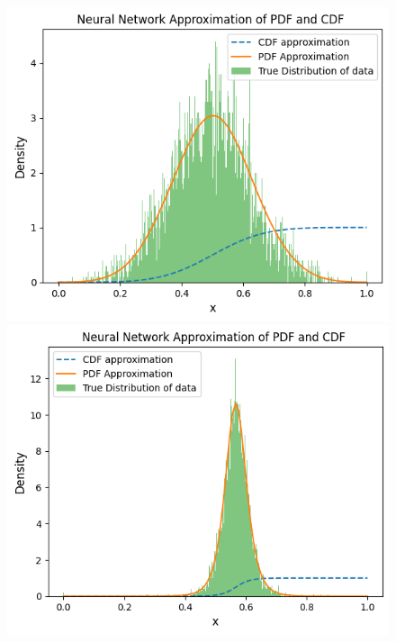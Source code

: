 \begin{figure}[h]
\centering

\begin{minipage}{0.49\textwidth}
\centering
\includegraphics[width=\textwidth]{5ResultsDiscussion/pictures/MarginalTest/Gaussian.png}
\end{minipage}
\hfill
\begin{minipage}{0.49\textwidth}
\centering
\includegraphics[width=\textwidth]{5ResultsDiscussion/pictures/MarginalTest/Students.png}
\end{minipage}


\end{figure}
